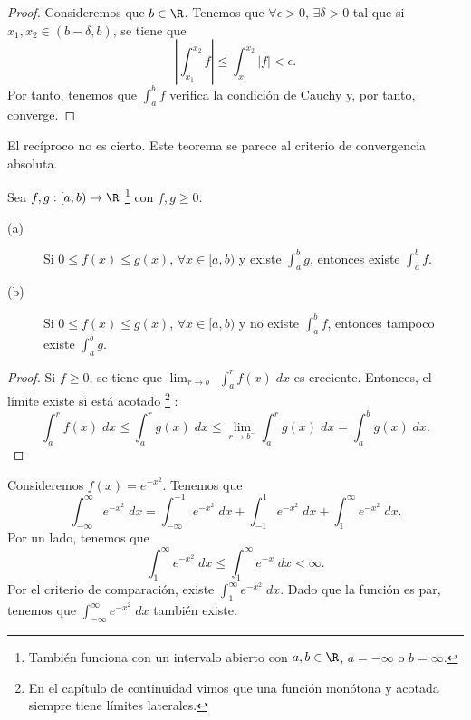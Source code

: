 \begin{proof}
Consideremos que $\displaystyle b \in \R $. Tenemos que $\displaystyle \forall \epsilon > 0 $, $\displaystyle \exists \delta > 0 $ tal que si $\displaystyle x_{1}, x_{2} \in \left(b-\delta, b\right) $, se tiene que 
\[ \left|\int^{x_{2}}_{x_{1}} f \right| \leq \int^{x_{2}}_{x_{1}} \left|f\right| < \epsilon.\]
Por tanto, tenemos que $\displaystyle \int^{b}_{a} f $ verifica la condición de Cauchy y, por tanto, converge. 
\end{proof}
\begin{observation}
\normalfont El recíproco no es cierto. Este teorema se parece al criterio de convergencia absoluta.
\end{observation}
\begin{ftheorem}
\normalfont Sea $\displaystyle f,g:[a,b) \to \R $ \footnote{También funciona con un intervalo abierto con $\displaystyle a,b \in \R $, $\displaystyle a = - \infty $ o $\displaystyle b = \infty $.} con $\displaystyle f,g \geq 0 $.
\begin{description}
\item[(a)] Si $\displaystyle 0 \leq f\left(x\right) \leq g\left(x\right) $, $\displaystyle \forall x \in [a,b) $ y existe $\displaystyle \int^{b}_{a} g $, entonces existe $\displaystyle \int^{b}_{a} f $.
\item[(b)] Si $\displaystyle 0 \leq f\left(x\right) \leq g\left(x\right) $, $\displaystyle \forall x \in [a,b) $ y no existe $\displaystyle \int^{b}_{a} f $, entonces tampoco existe $\displaystyle \int^{b}_{a} g $.
\end{description}
\end{ftheorem}
\begin{proof}
	Si $\displaystyle f \geq 0 $, se tiene que $\displaystyle \lim_{r \to b^{-}}\int^{r}_{a} f\left(x\right) \; dx $ es creciente. Entonces, el límite existe si está acotado \footnote{En el capítulo de continuidad vimos que una función monótona y acotada siempre tiene límites laterales.} :
	\[ \int^{r}_{a} f\left(x\right) \; dx \leq \int^{r}_{a} g\left(x\right) \; dx \leq \lim_{r \to b^{-}}\int^{r}_{a} g\left(x\right) \; dx = \int^{b}_{a} g\left(x\right) \; dx .\]
\end{proof}
\begin{eg}
\normalfont Consideremos $\displaystyle f\left(x\right) = e^{-x^{2}} $. Tenemos que
\[ \int^{\infty}_{-\infty} e^{-x^{2}} \; dx =  \int^{-1}_{-\infty} e^{-x^{2}} \; dx + \int^{1}_{-1} e^{-x^{2}} \; dx  + \int^{\infty}_{1} e^{-x^{2}} \; dx .\]
Por un lado, tenemos que 
\[ \int^{\infty}_{1} e^{-x^{2}} \; dx \leq \int^{\infty}_{1} e^{-x} \; dx < \infty .\]
Por el criterio de comparación, existe $\displaystyle \int^{\infty}_{1} e^{-x^{2}} \; dx $. Dado que la función es par, tenemos que $\displaystyle \int^{\infty}_{-\infty } e^{-x^{2}} \; dx $ también existe.
\end{eg}

